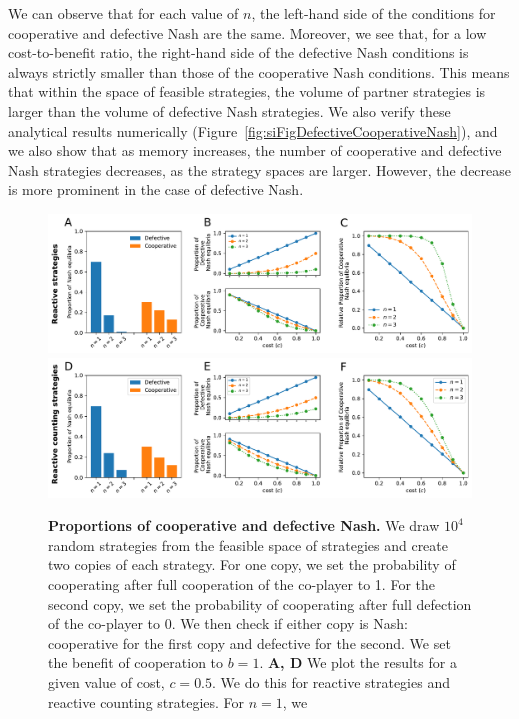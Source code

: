 \documentclass[11pt]{article}
\theoremstyle{plainCl1}
\theoremstyle{plainCl2}
\begin{document}
\noindent
We can observe that for each value of \(n\), the left-hand side of the
conditions for cooperative and defective Nash are the same. Moreover, we see
that, for a low cost-to-benefit ratio, the right-hand side of the defective Nash
conditions is always strictly smaller than those of the cooperative Nash
conditions. This means that within the space of feasible strategies, the volume
of partner strategies is larger than the volume of defective Nash strategies. We
also verify these analytical results numerically
(Figure~\ref{fig:siFigDefectiveCooperativeNash}), and we also show that as memory increases,
the number of cooperative and defective Nash strategies decreases, as the
strategy spaces are larger. However, the decrease is more prominent in the case
of defective Nash.

\begin{figure}[h]
  \centering
  \includegraphics[width=\textwidth]{../../figures/siFig1.pdf}
  \includegraphics[width=\textwidth]{../../figures/siFig1Counting.pdf}
  \caption{
  \textbf{Proportions of cooperative and defective Nash.}
We draw \(10^4\) random strategies from the feasible space of strategies and
create two copies of each strategy. For one copy, we set the probability of
cooperating after full cooperation of the co-player to 1. For the second copy,
we set the probability of cooperating after full defection of the co-player to
0. We then check if either copy is Nash: cooperative for the first copy and
defective for the second. We set the benefit of cooperation to \(b = 1\).
{\bf A, D} We plot the results for a given value of cost, \(c = 0.5\). We do
this for reactive strategies and reactive counting strategies. For \(n=1\), we
}
\end{figure}
\end{document}
